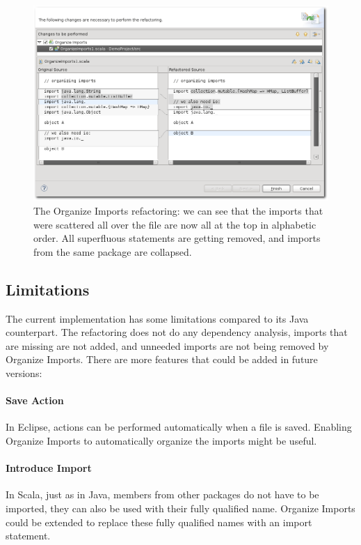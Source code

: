 \documentclass[10pt,a4paper,oneside]{scrreprt}
\begin{document}
\begin{figure}
  \centering
  \includegraphics[width=\linewidth]{organize_screenshot_1.png}
  \caption{The Organize Imports refactoring: we can see that the imports that were scattered all over the file are now all at the top in alphabetic order. All superfluous statements are getting removed, and imports from the same package are collapsed.}
  \label{figure:organize-screenshot-1}
\end{figure}

\subsection{Limitations}

The current implementation has some limitations compared to its Java counterpart. The refactoring does not do any dependency analysis, imports that are missing are not added, and unneeded imports are not being removed by Organize Imports. There are more features that could be added in future versions:

\paragraph{Save Action} In Eclipse, actions can be performed automatically when a file is saved. Enabling Organize Imports to automatically organize the imports might be useful.

\paragraph{Introduce Import} In Scala, just as in Java, members from other packages do not have to be imported, they can also be used with their fully qualified name. Organize Imports could be extended to replace these fully qualified names with an import statement. 
\end{document}
